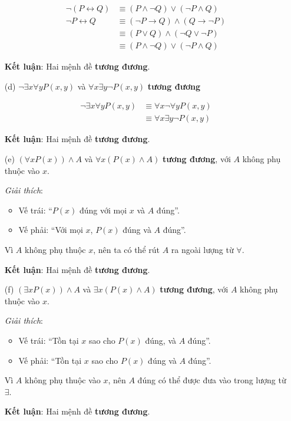 \documentclass[11pt, oneside,openright,a4paper]{book}
\begin{document}
\begin{enumerate}
    \begin{align*}
        \neg(P \leftrightarrow Q) &\equiv (P \land \neg Q) \lor (\neg P \land Q) \\
        \neg P \leftrightarrow Q &\equiv (\neg P \rightarrow Q) \land (Q \rightarrow \neg P) \\
        &\equiv (P \lor Q) \land (\neg Q \lor \neg P) \\
        &\equiv (P \land \neg Q) \lor (\neg P \land Q)
    \end{align*}

    \textbf{Kết luận}: Hai mệnh đề \textbf{tương đương}.

    \item[(d)] $\neg \exists x \forall y P(x, y)$ và $\forall x \exists y \neg P(x, y)$ \textbf{tương đương}

    \begin{align*}
        \neg \exists x \forall y P(x, y) &\equiv \forall x \neg \forall y P(x, y) \\
        &\equiv \forall x \exists y \neg P(x, y)
    \end{align*}

    \textbf{Kết luận}: Hai mệnh đề \textbf{tương đương}.

    \item[(e)] $(\forall x P(x)) \land A$ và $\forall x(P(x) \land A)$ \textbf{tương đương}, với $A$ không phụ thuộc vào $x$.

    \textit{Giải thích}:

    \begin{itemize}
        \item Vế trái: ``$P(x)$ đúng với mọi $x$ và $A$ đúng''.
        \item Vế phải: ``Với mọi $x$, $P(x)$ đúng và $A$ đúng''.
    \end{itemize}

    Vì $A$ không phụ thuộc $x$, nên ta có thể rút $A$ ra ngoài lượng từ $\forall$.

    \textbf{Kết luận}: Hai mệnh đề \textbf{tương đương}.

    \item[(f)] $(\exists x P(x)) \land A$ và $\exists x(P(x) \land A)$ \textbf{tương đương}, với $A$ không phụ thuộc vào $x$.

    \textit{Giải thích}:

    \begin{itemize}
        \item Vế trái: ``Tồn tại $x$ sao cho $P(x)$ đúng, và $A$ đúng''.
        \item Vế phải: ``Tồn tại $x$ sao cho $P(x)$ đúng và $A$ đúng''.
    \end{itemize}

    Vì $A$ không phụ thuộc vào $x$, nên $A$ đúng có thể được đưa vào trong lượng từ $\exists$.

    \textbf{Kết luận}: Hai mệnh đề \textbf{tương đương}.
\end{enumerate}
\end{document}
